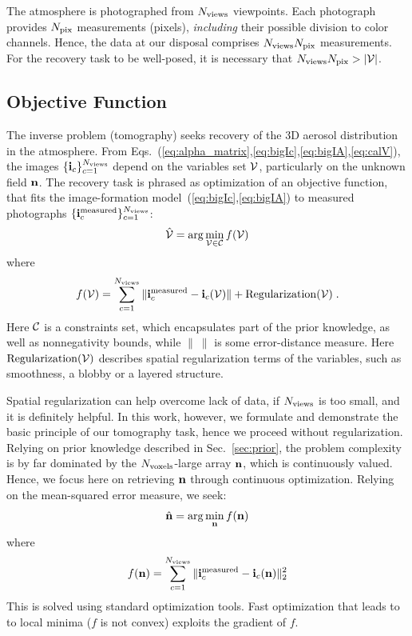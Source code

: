 \documentclass[10pt,twocolumn,letterpaper]{article}
\newcommand{\argmin}{\mathrm{arg}\min}
\begin{document}
The atmosphere is photographed from $N_{\rm views}$ viewpoints. Each photograph provides $N_{\rm pix}$  measurements (pixels), {\em including} their possible division to color channels. Hence, the data at our disposal comprises $N_{\rm views}N_{\rm pix}$ measurements.
For the recovery task to be well-posed, it is necessary that
$N_{\rm views}N_{\rm pix}>|{\cal V}|$.


\subsection{Objective Function}
\label{sec:objective-function}

The inverse problem (tomography) seeks recovery of the 3D aerosol distribution in the atmosphere. From Eqs.~(\ref{eq:alpha_matrix},\ref{eq:bigIc},\ref{eq:bigIA},\ref{eq:calV}),
the images $\{ {\bf i}_c\}_{c=1}^{N_{\rm views}}$ depend on the variables set ${\cal V}$, particularly on the unknown field ${\bf n}$. The recovery task is phrased as optimization of an objective function, that fits the image-formation model~(\ref{eq:bigIc},\ref{eq:bigIA}) to
measured photographs $\{ {\bf i}^{\rm measured}_c\}_{c=1}^{N_{\rm views}}$:
\begin{equation}
  \label{eq:mingenobjective}
  \hat{\cal V} = \argmin_{{\cal V}\in {\cal C}} f({\cal V})
\end{equation}
where
\begin{equation}
  \label{eq:genobjective}
  f({\cal V}) = \sum_{c=1}^{N_{\rm views}}
  \| {\bf i}^{\rm measured}_c - {\bf i}_c({\cal V})\| + {\rm Regularization}({\cal V})
  \;.
\end{equation}
Here ${\cal C}$ is a constraints set, which encapsulates part of the prior knowledge,
as well as nonnegativity bounds, while $\|~\|$ is some error-distance measure.
Here ${\rm Regularization}({\cal V})$ describes spatial regularization terms of the variables, such as smoothness, a blobby or a layered structure.

Spatial regularization can help overcome lack of data, if $N_{\rm views}$ is too small, and it is definitely helpful. In this work, however, we formulate and demonstrate the basic principle of our tomography task, hence
we proceed without regularization. Relying on prior knowledge described in Sec.~\ref{sec:prior}, the problem complexity is by far dominated by the $N_{\rm voxels}$-large array ${\bf n}$, which is continuously valued. Hence, we focus here on retrieving ${\bf n}$ through continuous optimization. Relying on the mean-squared error measure, we seek:
\begin{equation}
  \label{eq:minobjectiveA}
  \hat{\bf n} =
      \argmin_{{\bf n}} f({\bf n})
\end{equation}
where
\begin{equation}
  \label{eq:objectiveA}
  f({\bf n})
   = \sum_{c=1}^{N_{\rm views}}
  \| {\bf i}^{\rm measured}_c - {\bf i}_c({\bf n})\|^2_2
\end{equation}
This is solved using standard optimization tools. Fast optimization that leads to
to local minima ($f$ is not convex) exploits the gradient of $f$.
\end{document}
